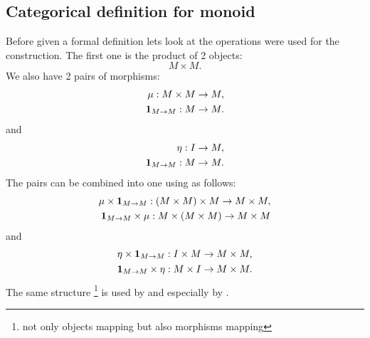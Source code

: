\subsection{Categorical definition for monoid}
\label{ch:monoid_categorically}
Before given a formal definition lets look at the operations were used
for the construction. The first one is the product of 2 objects:
\[
M \times M.
\]
We also have 2 pairs of morphisms:
\begin{eqnarray}
\mu: M \times M \to M,
\nonumber \\
\mathbf{1}_{ M \to M }: M \to M.
\nonumber
\end{eqnarray}
and
\begin{eqnarray}
\eta: I \to M, 
\nonumber \\
\mathbf{1}_{ M \to M }: M \to M.
\nonumber
\end{eqnarray}
The pairs can be combined into one using
 as follows:
\begin{eqnarray}
\mu \times \mathbf{1}_{ M \to M }: \left(M \times M\right) \times M \to M \times M,
\nonumber \\
\mathbf{1}_{ M \to M } \times \mu: M \times \left(M \times M\right) \to M \times M
\nonumber
\end{eqnarray}
and
\begin{eqnarray}
\eta \times \mathbf{1}_{ M \to M }: I \times M \to M \times M,
\nonumber \\
\mathbf{1}_{ M \to M } \times \eta: M \times I \to M \times M.
\nonumber
\end{eqnarray}
The same structure 
\footnote{not only objects mapping but also morphisms mapping}
is used by
and
especially by .  

